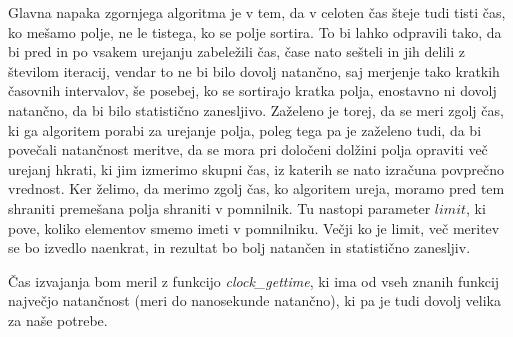 \documentclass[a4paper,oneside,10pt]{article}
\begin{document}
Glavna napaka zgornjega algoritma je v tem, da v celoten čas šteje tudi tisti čas, ko
mešamo polje, ne le tistega, ko se polje sortira. To bi lahko odpravili tako, da bi pred
in po vsakem urejanju zabeležili čas, čase nato sešteli in jih delili z številom iteracij,
vendar to ne bi bilo dovolj natančno, saj merjenje tako kratkih časovnih intervalov,
še posebej, ko se sortirajo kratka polja, enostavno ni dovolj natančno, da bi bilo
statistično zanesljivo. Zaželeno je torej, da se meri zgolj čas, ki ga algoritem porabi za
urejanje polja, poleg tega pa je zaželeno tudi, da bi povečali natančnost meritve, da se mora
pri določeni dolžini polja opraviti več urejanj hkrati, ki jim izmerimo skupni čas, iz katerih se nato izračuna povprečno
vrednost. Ker želimo, da merimo zgolj čas, ko algoritem ureja, moramo pred tem shraniti
premešana polja shraniti v pomnilnik. Tu nastopi parameter $limit$, ki pove, koliko
elementov smemo imeti v pomnilniku. Večji ko je limit, več meritev se bo izvedlo naenkrat,
in rezultat bo bolj natančen in statistično zanesljiv.

Čas izvajanja bom meril z funkcijo \emph{clock\_gettime}, ki ima od vseh znanih
funkcij največjo natančnost (meri do nanosekunde natančno), ki pa je tudi dovolj
velika za naše potrebe.
\end{document}
